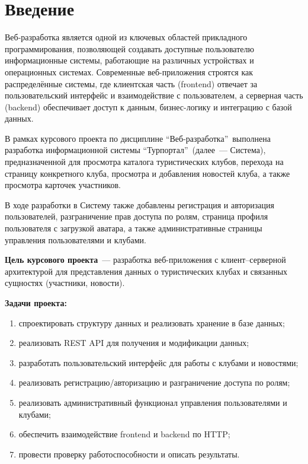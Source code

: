 \documentclass[utf8, russian]{eskdtext}
\let\stdsection\section
\renewcommand \section{\newpage\stdsection}
\begin{document}
\maketitle

\tableofcontents

\section*{Введение}

Веб-разработка является одной из ключевых областей прикладного программирования, позволяющей создавать доступные пользователю информационные системы, работающие на различных устройствах и операционных системах. Современные веб-приложения строятся как распределённые системы, где клиентская часть (frontend) отвечает за пользовательский интерфейс и взаимодействие с пользователем, а серверная часть (backend) обеспечивает доступ к данным, бизнес-логику и интеграцию с базой данных.

В рамках курсового проекта по дисциплине \textquotedblleft Веб-разработка\textquotedblright\ выполнена разработка информационной системы \textquotedblleft Турпортал\textquotedblright\ (далее~--- Система), предназначенной для просмотра каталога туристических клубов, перехода на страницу конкретного клуба, просмотра и добавления новостей клуба, а также просмотра карточек участников.

В ходе разработки в Систему также добавлены регистрация и авторизация пользователей, разграничение прав доступа по ролям, страница профиля пользователя с загрузкой аватара, а также административные страницы управления пользователями и клубами.

\textbf{Цель курсового проекта}~--- разработка веб-приложения с клиент--серверной архитектурой для представления данных о туристических клубах и связанных сущностях (участники, новости).

\textbf{Задачи проекта:}
\begin{enumerate}
  \item спроектировать структуру данных и реализовать хранение в базе данных;
  \item реализовать REST API для получения и модификации данных;
  \item разработать пользовательский интерфейс для работы с клубами и новостями;
  \item реализовать регистрацию/авторизацию и разграничение доступа по ролям;
  \item реализовать административный функционал управления пользователями и клубами;
  \item обеспечить взаимодействие frontend и backend по HTTP;
  \item провести проверку работоспособности и описать результаты.
\end{enumerate}
\end{document}
